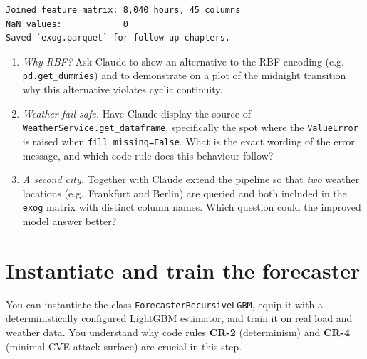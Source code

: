 \documentclass[
  english,
  letterpaper,
]{scrbook}
\providecommand{\tightlist}{%
  \setlength{\itemsep}{0pt}\setlength{\parskip}{0pt}}
\begin{document}
\begin{verbatim}
Joined feature matrix: 8,040 hours, 45 columns
NaN values:            0
Saved `exog.parquet` for follow-up chapters.
\end{verbatim}

\begin{tcolorbox}[enhanced jigsaw, arc=.35mm, bottomrule=.15mm, bottomtitle=1mm, breakable, colback=white, colbacktitle=quarto-callout-tip-color!10!white, colframe=quarto-callout-tip-color-frame, coltitle=black, left=2mm, leftrule=.75mm, opacityback=0, opacitybacktitle=0.6, rightrule=.15mm, title=\textcolor{quarto-callout-tip-color}{\faLightbulb}\hspace{0.5em}{Exercises (with Claude)}, titlerule=0mm, toprule=.15mm, toptitle=1mm]

\begin{enumerate}
\def\labelenumi{\arabic{enumi}.}
\tightlist
\item
  \emph{Why RBF?} Ask Claude to show an alternative to the RBF encoding
  (e.g. \texttt{pd.get\_dummies}) and to demonstrate on a plot of the
  midnight transition why this alternative violates cyclic continuity.
\item
  \emph{Weather fail-safe.} Have Claude display the source of
  \texttt{WeatherService.get\_dataframe}, specifically the spot where
  the \texttt{ValueError} is raised when \texttt{fill\_missing=False}.
  What is the exact wording of the error message, and which code rule
  does this behaviour follow?
\item
  \emph{A second city.} Together with Claude extend the pipeline so that
  \emph{two} weather locations (e.g.~Frankfurt and Berlin) are queried
  and both included in the \texttt{exog} matrix with distinct column
  names. Which question could the improved model answer better?
\end{enumerate}

\end{tcolorbox}


\chapter{Instantiate and train the forecaster}\label{sec-train}

\begin{tcolorbox}[enhanced jigsaw, arc=.35mm, bottomrule=.15mm, bottomtitle=1mm, breakable, colback=white, colbacktitle=quarto-callout-note-color!10!white, colframe=quarto-callout-note-color-frame, coltitle=black, left=2mm, leftrule=.75mm, opacityback=0, opacitybacktitle=0.6, rightrule=.15mm, title=\textcolor{quarto-callout-note-color}{\faInfo}\hspace{0.5em}{Learning objective}, titlerule=0mm, toprule=.15mm, toptitle=1mm]

You can instantiate the class \texttt{ForecasterRecursiveLGBM}, equip it
with a deterministically configured LightGBM estimator, and train it on
real load and weather data. You understand why code rules \textbf{CR-2}
(determinism) and \textbf{CR-4} (minimal CVE attack surface) are crucial
in this step.

\end{tcolorbox}
\end{document}
